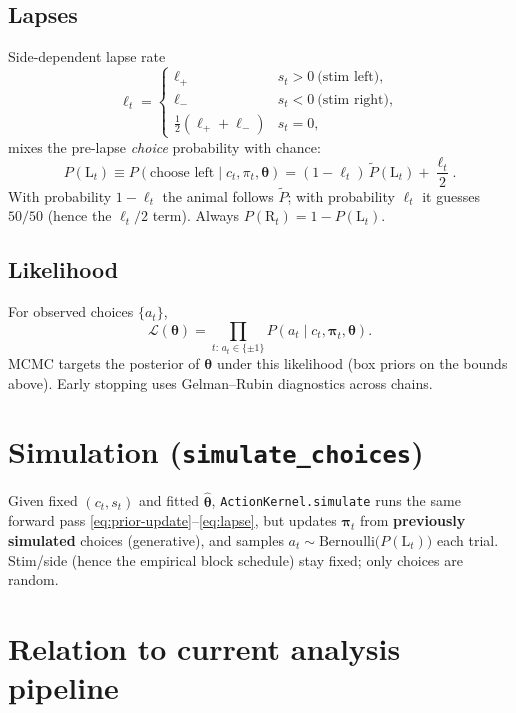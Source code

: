 \documentclass[11pt]{article}
\begin{document}
\subsection{Lapses}

Side-dependent lapse rate
\begin{equation}
\ell_t
=
\begin{cases}
\ell_+ & s_t > 0\ \text{(stim left)},\\
\ell_- & s_t < 0\ \text{(stim right)},\\
\tfrac12(\ell_++\ell_-) & s_t=0,
\end{cases}
\end{equation}
mixes the pre-lapse \emph{choice} probability with chance:
\begin{equation}
\label{eq:lapse}
P(\mathrm{L}_t)
\equiv
P(\text{choose left}\mid c_t,\pi_t,\bm\theta)
=
(1-\ell_t)\,\tilde P(\mathrm{L}_t)
+
\frac{\ell_t}{2}.
\end{equation}
With probability \(1-\ell_t\) the animal follows \(\tilde P\);
with probability \(\ell_t\) it guesses \(50/50\)
(hence the \(\ell_t/2\) term).
Always \(P(\mathrm{R}_t)=1-P(\mathrm{L}_t)\).

\subsection{Likelihood}

For observed choices \(\{a_t\}\),
\begin{equation}
\label{eq:lkd}
\mathcal{L}(\bm\theta)
=
\prod_{t:\,a_t\in\{\pm1\}}
P(a_t\mid c_t,\bm\pi_t,\bm\theta).
\end{equation}
MCMC targets the posterior of \(\bm\theta\) under this likelihood
(box priors on the bounds above). Early stopping uses
Gelman--Rubin diagnostics across chains.

\section{Simulation (\texttt{simulate\_choices})}

Given fixed \((c_t,s_t)\) and fitted \(\hat{\bm\theta}\),
\texttt{ActionKernel.simulate} runs the same forward pass
\eqref{eq:prior-update}--\eqref{eq:lapse}, but updates \(\bm\pi_t\) from
\textbf{previously simulated} choices (generative), and samples
\(a_t\sim\mathrm{Bernoulli}\bigl(P(\mathrm{L}_t)\bigr)\) each trial.
Stim/side (hence the empirical block schedule) stay fixed; only choices
are random.

\section{Relation to current analysis pipeline}
\end{document}
